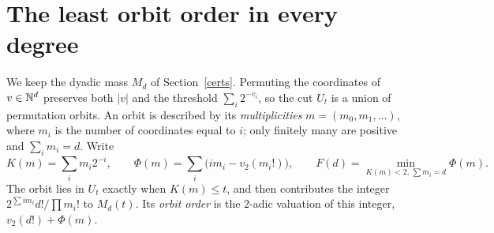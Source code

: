 \documentclass[11pt]{article}
\begin{document}
\section{The least orbit order in every degree}\label{leastsec}
We keep the dyadic mass \(M_d\) of Section~\ref{certs}. Permuting the
coordinates of \(v\in\mathbb N^d\) preserves both \(|v|\) and the threshold
\(\sum_i2^{-v_i}\), so the cut \(U_t\) is a union of permutation orbits. An
orbit is described by its \emph{multiplicities} \(m=(m_0,m_1,\ldots)\), where
\(m_i\) is the number of coordinates equal to \(i\); only finitely many are
positive and \(\sum_im_i=d\). Write
\[
 K(m)=\sum_i m_i2^{-i},\qquad
 \Phi(m)=\sum_i\bigl(i m_i-v_2(m_i!)\bigr),\qquad
 F(d)=\min_{K(m)<2,\,\sum m_i=d}\Phi(m).
\]
The orbit lies in \(U_t\) exactly when \(K(m)\le t\), and then contributes
the integer \(2^{\sum i m_i} d!/\prod m_i!\) to \(M_d(t)\). Its
\emph{orbit order} is the \(2\)-adic valuation of this integer,
\(v_2(d!)+\Phi(m)\).
\end{document}

